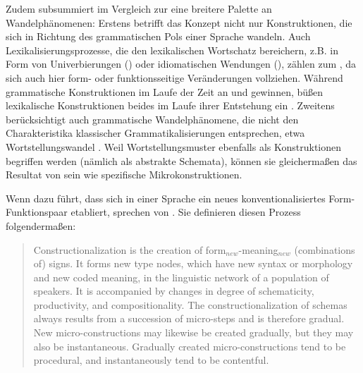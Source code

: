 Zudem subsummiert  im Vergleich zur  eine breitere Palette an Wandelphänomenen: Erstens betrifft das Konzept nicht nur Konstruktionen, die sich in Richtung des grammatischen Pols einer Sprache wandeln. Auch Lexikalisierungsprozesse,  die den lexikalischen Wortschatz bereichern, z.B. in Form von Univerbierungen () oder idiomatischen Wendungen (), zählen zum  \parencite[64]{Hilpert2011}, da sich auch hier form- oder funktionsseitige Veränderungen vollziehen. Während grammatische Konstruktionen  im Laufe der Zeit an  und  gewinnen, büßen lexikalische Konstruktionen beides im Laufe ihrer Entstehung ein \parencite[vgl.][164]{Traugott2013}. Zweitens berücksichtigt  auch grammatische Wandelphänomene, die nicht den Charakteristika klassischer Grammatikalisierungen  entsprechen, etwa Wortstellungswandel \parencite[vgl.][65]{Hilpert2011}. Weil Wortstellungsmuster  ebenfalls als Konstruktionen begriffen werden (nämlich als abstrakte Schemata),  können sie gleichermaßen das Resultat von  sein wie spezifische Mikrokonstruktionen. 

Wenn  dazu führt, dass sich in einer Sprache ein neues konventionalisiertes Form-Funktionspaar etabliert, sprechen \textcite{Traugott2013} von . Sie definieren diesen Prozess folgendermaßen:  \blockcquote[22]{Traugott2013}{Constructionalization is the creation of form$_{new}$-meaning$_{new}$ (combinations of) signs. It forms new type nodes, which have new syntax or morphology and new coded meaning, in the linguistic network of a population of speakers. It is accompanied by changes in degree of schematicity,
productivity, and compositionality. The constructionalization of schemas
always results from a succession of micro-steps and is therefore gradual.
New micro-constructions may likewise be created gradually, but they may
also be instantaneous. Gradually created micro-constructions tend to be
procedural, and instantaneously tend to be
contentful.}

